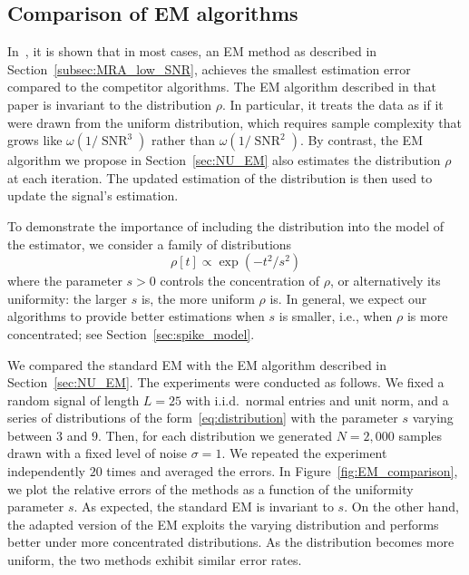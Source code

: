 \documentclass{IEEEtran}
\numberwithin{equation}{section}
\numberwithin{figure}{section}
\theoremstyle{plain}
\theoremstyle{definition}
\theoremstyle{remark}
\theoremstyle{plain}
\theoremstyle{remark}
\theoremstyle{plain}
\theoremstyle{plain}
\theoremstyle{remark}
\newcommand{\SNR}{\operatorname{SNR}}
\begin{document}
\subsection{Comparison of EM algorithms}

In~\cite{bendory2017bispectrum}, it is shown that in most cases, an EM method as described in Section~\ref{subsec:MRA_low_SNR}, achieves the smallest estimation error compared to the competitor algorithms.
The EM algorithm described in that paper is invariant to the distribution $\rho$. In particular, it treats the data as if it were drawn from the uniform distribution, which requires sample complexity that grows like $\omega(1/\SNR^3)$ rather than $\omega(1/\SNR^2)$. By contrast, the EM algorithm we propose in Section~\ref{sec:NU_EM} also estimates the distribution $\rho$ at each iteration. The updated estimation of the distribution is then used to update the signal's estimation. 


To demonstrate the importance of including the distribution into the model of the estimator, we consider a family of distributions 
\begin{equation} \label{eq:distribution}
\rho[t] \propto \exp(-t^2 / s^2)
\end{equation}
where the parameter $s > 0$ controls the concentration of $\rho$, or alternatively its uniformity: the larger $s$ is, the more uniform $\rho$ is. In general, we expect our algorithms to provide better estimations when $s$ is smaller, i.e., when $\rho$ is more concentrated; see Section~\ref{sec:spike_model}. 

We compared the standard EM with the EM algorithm described in Section~\ref{sec:NU_EM}. The experiments were conducted as follows. We fixed a random signal of length $L=25$ with i.i.d.\ normal entries and unit norm, and a series of distributions of the form~\eqref{eq:distribution} with the parameter $s$ varying between $3$ and $9$. Then, for each distribution we generated $N=2,000$ samples drawn with a fixed level of noise $\sigma = 1 $. We repeated the experiment independently $20$ times and averaged the errors. In Figure~\ref{fig:EM_comparison}, we plot the relative errors of the methods as a function of the uniformity parameter $s$. As expected, the standard EM is invariant to $s$. On the other hand, the adapted version of the EM exploits the varying distribution and performs better under more concentrated distributions. As the distribution becomes more uniform, the two methods exhibit similar error rates.
\end{document}
